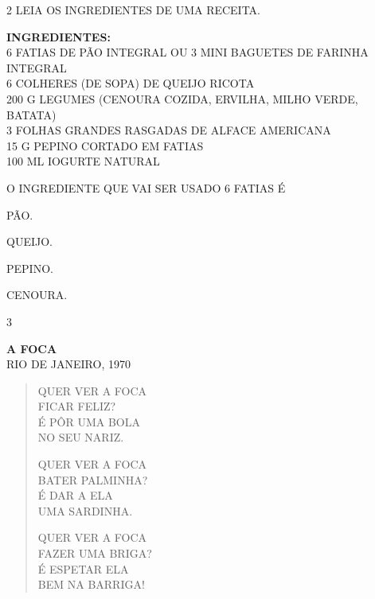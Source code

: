 \begin{escola}

\num{2} LEIA OS INGREDIENTES DE UMA RECEITA.

\textbf{INGREDIENTES:}\\
6 FATIAS DE PÃO INTEGRAL OU 3 MINI BAGUETES DE FARINHA INTEGRAL\\
6 COLHERES (DE SOPA) DE QUEIJO RICOTA\\
200 G LEGUMES (CENOURA COZIDA, ERVILHA, MILHO VERDE, BATATA)\\
3 FOLHAS GRANDES RASGADAS DE ALFACE AMERICANA\\
15 G PEPINO CORTADO EM FATIAS\\
100 ML IOGURTE NATURAL


O INGREDIENTE QUE VAI SER USADO 6 FATIAS É

\begin{escolha}
\item PÃO.

\item QUEIJO.

\item PEPINO.

\item CENOURA.
\end{escolha}


\num{3}

\textbf{A FOCA}\\
RIO DE JANEIRO, 1970

\begin{verse}
QUER VER A FOCA\\
FICAR FELIZ?\\
É PÔR UMA BOLA\\
NO SEU NARIZ.

QUER VER A FOCA\\
BATER PALMINHA?\\
É DAR A ELA\\
UMA SARDINHA.

QUER VER A FOCA\\
FAZER UMA BRIGA?\\
É ESPETAR ELA\\
BEM NA BARRIGA!
\end{verse}


\end{escola}
